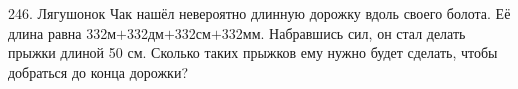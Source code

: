 246. Лягушонок Чак нашёл невероятно длинную дорожку вдоль своего болота. Её длина равна 332м$+$332дм$+$332см$+$332мм. Набравшись сил, он стал делать прыжки длиной 50 см. Сколько таких прыжков ему нужно будет сделать, чтобы добраться до конца дорожки?\\
